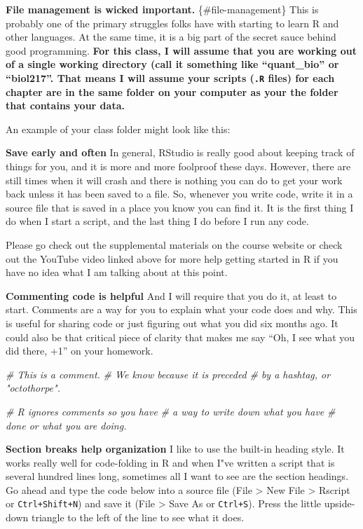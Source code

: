 \documentclass[
]{book}
\newenvironment{Shaded}{\begin{snugshade}}{\end{snugshade}}
\newcommand{\CommentTok}[1]{\textcolor[rgb]{0.56,0.35,0.01}{\textit{#1}}}
\begin{document}
\textbf{File management is wicked important.} \{\#file-management\} This is probably one of the primary struggles folks have with starting to learn R and other languages. At the same time, it is a big part of the secret sauce behind good programming. \textbf{For this class, I will assume that you are working out of a single working directory (call it something like ``quant\_bio'' or ``biol217''. That means I will assume your scripts (\texttt{.R} files) for each chapter are in the same folder on your computer as your the folder that contains your data.}

An example of your class folder might look like this:

\textbf{Save early and often}
In general, RStudio is really good about keeping track of things for you, and it is more and more foolproof these days. However, there are still times when it will crash and there is nothing you can do to get your work back unless it has been saved to a file. So, whenever you write code, write it in a source file that is saved in a place you know you can find it. It is the first thing I do when I start a script, and the last thing I do before I run any code.

Please go check out the supplemental materials on the course website or check out the YouTube video linked above for more help getting started in R if you have no idea what I am talking about at this point.

\textbf{Commenting code is helpful}
And I will require that you do it, at least to start. Comments are a way for you to explain what your code does and why. This is useful for sharing code or just figuring out what you did six months ago. It could also be that critical piece of clarity that makes me say ``Oh, I see what you did there, +1'' on your homework.

\begin{Shaded}
\begin{Highlighting}[]
\CommentTok{# This is a comment.}
\CommentTok{# We know because it is preceded}
\CommentTok{# by a hashtag, or "octothorpe".}

\CommentTok{# R ignores comments so you have}
\CommentTok{# a way to write down what you have}
\CommentTok{# done or what you are doing.}
\end{Highlighting}
\end{Shaded}

\textbf{Section breaks help organization}
I like to use the built-in heading style. It works really well for code-folding in R and when I"ve written a script that is several hundred lines long, sometimes all I want to see are the section headings. Go ahead and type the code below into a source file (File \textgreater{} New File \textgreater{} Rscript or \texttt{Ctrl+Shift+N}) and save it (File \textgreater{} Save As or \texttt{Ctrl+S}). Press the little upside-down triangle to the left of the line to see what it does.
\end{document}
